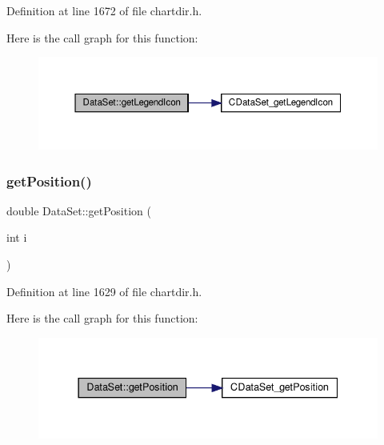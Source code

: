 Definition at line 1672 of file chartdir.\+h.

Here is the call graph for this function\+:
\nopagebreak
\begin{figure}[H]
\begin{center}
\leavevmode
\includegraphics[width=350pt]{class_data_set_ab4d4572923940e112a3b4d50da670854_cgraph}
\end{center}
\end{figure}
\mbox{\label{class_data_set_aa514c7c8f77b54a6fbf5d29d4af2c25e}} 
\subsubsection{\texorpdfstring{get\+Position()}{getPosition()}}
{\footnotesize\ttfamily double Data\+Set\+::get\+Position (\begin{DoxyParamCaption}\item[{int}]{i }\end{DoxyParamCaption})\hspace{0.3cm}{\ttfamily [inline]}}



Definition at line 1629 of file chartdir.\+h.

Here is the call graph for this function\+:
\nopagebreak
\begin{figure}[H]
\begin{center}
\leavevmode
\includegraphics[width=337pt]{class_data_set_aa514c7c8f77b54a6fbf5d29d4af2c25e_cgraph}
\end{center}
\end{figure}
\mbox{\label{class_data_set_aa57e5e6fe299e68f398ef304944bbf47}} 
